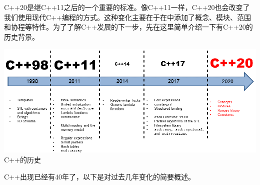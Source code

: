 
C++20是继C++11之后的一个重要的标准。像C++11一样，C++20也会改变了我们使用现代C++编程的方式。这种变化主要在于在中添加了概念、模块、范围和协程等特性。为了了解C++发展的下一步，先在这里简单介绍一下有C++20的历史背景。

\begin{center}
\includegraphics[width=1.0\textwidth]{content/1/chapter1/images/1.png}\\
C++的历史
\end{center}

C++出现已经有40年了，以下是对过去几年变化的简要概述。





























